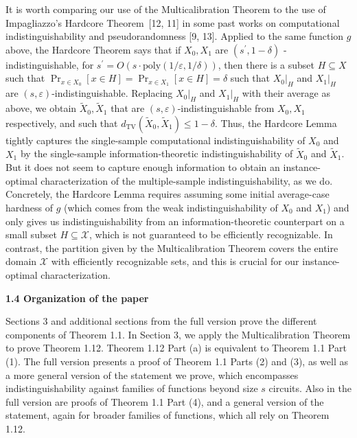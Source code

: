 It is worth comparing our use of the Multicalibration Theorem to the use of Impagliazzo’s Hardcore Theorem [12, 11] in some past works on computational indistinguishability and pseudorandomness [9, 13]. Applied to the same function $g$ above, the Hardcore Theorem says that if $X_{0},X_{1}$ are $(s^{\prime},1-\delta)$
-indistinguishable, for $s^{\prime}=O(s\cdot\mathrm{poly}(1/\varepsilon,1/\delta))$, then there is a subset $H\subseteq X$ such that $\Pr_{x\in X_{0}}[x\in H]=\Pr_{x\in X_{1}}[x\in H]=\delta$ such that $X_{0}|_{H}$ and $X_{1}|_{H}$ are $(s,\varepsilon)$-indistinguishable. Replacing $X_{0}|_{H}$ and $X_{1}|_{H}$ with their average as above, we obtain $\widetilde{X}_{0},\widetilde{X}_{1}$ that are $(s,\varepsilon)$-indistinguishable from $X_{0},X_{1}$ respectively, and such that $d_{\mathrm{TV}}(\widetilde{X}_{0},\widetilde{X}_{1})\leq 1-\delta.$ Thus, the Hardcore Lemma tightly captures the single-sample computational indistinguishability of $X_{0}$ and $X_{1}$ by the single-sample information-theoretic indistinguishability of $\widetilde{X}_{0}$ and $\widetilde{X}_{1}$. But it does not seem to capture enough information to obtain an instance-optimal characterization of the multiple-sample indistinguishability, as we do. Concretely, the Hardcore Lemma requires assuming some initial average-case hardness of $g$ (which comes from the weak indistinguishability of $X_{0}$ and $X_{1}$) and only gives us indistinguishability from an information-theoretic counterpart on a small subset $H\subseteq\mathcal{X}$, which is not guaranteed to be efficiently recognizable. In contrast, the partition given by the Multicalibration Theorem covers the entire domain $\mathcal{X}$ with efficiently recognizable sets, and this is crucial for our instance-optimal characterization.\par






\par\medskip\noindent\textbf{
1.4 Organization of the paper}\par




Sections 3 and additional sections from the full version prove the different components of Theorem 1.1. In Section 3, we apply the Multicalibration Theorem to prove Theorem 1.12. Theorem 1.12 Part (a) is equivalent to Theorem 1.1 Part (1). The full version presents a proof of Theorem 1.1 Parts (2) and (3), as well as a more general version of the statement we prove, which encompasses indistinguishability against families of functions beyond size $s$ circuits. Also in the full version are proofs of Theorem 1.1 Part (4), and a general version of the statement, again for broader families of functions, which all rely on Theorem 1.12.\par




